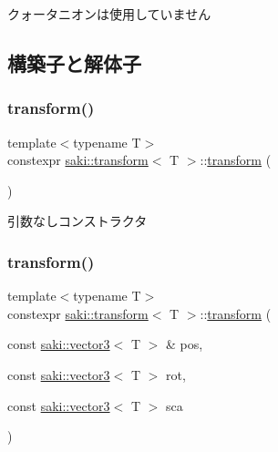 クォータニオンは使用していません 

\subsection{構築子と解体子}
\mbox{\label{classsaki_1_1transform_a6d3d745d729424d11a67514dcbedfc4b}} 
\subsubsection{\texorpdfstring{transform()}{transform()}\hspace{0.1cm}{\footnotesize\ttfamily [1/4]}}
{\footnotesize\ttfamily template$<$typename T$>$ \\
constexpr \mbox{\hyperlink{classsaki_1_1transform}{saki\+::transform}}$<$ T $>$\+::\mbox{\hyperlink{classsaki_1_1transform}{transform}} (\begin{DoxyParamCaption}{ }\end{DoxyParamCaption})\hspace{0.3cm}{\ttfamily [inline]}}



引数なしコンストラクタ 

\mbox{\label{classsaki_1_1transform_ac15fa38cf81fb789850a512fc5baef25}} 
\subsubsection{\texorpdfstring{transform()}{transform()}\hspace{0.1cm}{\footnotesize\ttfamily [2/4]}}
{\footnotesize\ttfamily template$<$typename T$>$ \\
constexpr \mbox{\hyperlink{classsaki_1_1transform}{saki\+::transform}}$<$ T $>$\+::\mbox{\hyperlink{classsaki_1_1transform}{transform}} (\begin{DoxyParamCaption}\item[{const \mbox{\hyperlink{classsaki_1_1vector3}{saki\+::vector3}}$<$ T $>$ \&}]{pos,  }\item[{const \mbox{\hyperlink{classsaki_1_1vector3}{saki\+::vector3}}$<$ T $>$}]{rot,  }\item[{const \mbox{\hyperlink{classsaki_1_1vector3}{saki\+::vector3}}$<$ T $>$}]{sca }\end{DoxyParamCaption})\hspace{0.3cm}{\ttfamily [inline]}}



